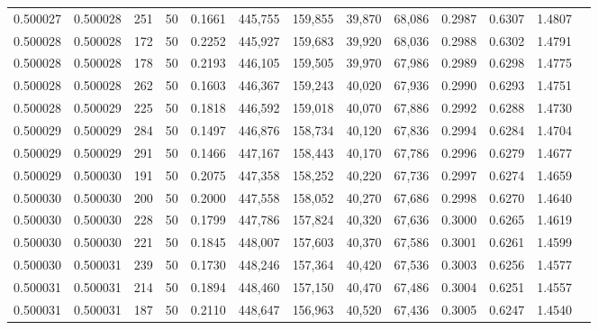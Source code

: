 \begin{tabular}{rrrrrrrrrrrrr}
0.500027 & 0.500028 &   251 &  50 &                                     0.1661 & 445,755 & 159,855 &  39,870 &  68,086 & 0.2987 & 0.6307 & 1.4807 \\
0.500028 & 0.500028 &   172 &  50 &                                     0.2252 & 445,927 & 159,683 &  39,920 &  68,036 & 0.2988 & 0.6302 & 1.4791 \\
0.500028 & 0.500028 &   178 &  50 &                                     0.2193 & 446,105 & 159,505 &  39,970 &  67,986 & 0.2989 & 0.6298 & 1.4775 \\
0.500028 & 0.500028 &   262 &  50 &                                     0.1603 & 446,367 & 159,243 &  40,020 &  67,936 & 0.2990 & 0.6293 & 1.4751 \\
0.500028 & 0.500029 &   225 &  50 &                                     0.1818 & 446,592 & 159,018 &  40,070 &  67,886 & 0.2992 & 0.6288 & 1.4730 \\
0.500029 & 0.500029 &   284 &  50 &                                     0.1497 & 446,876 & 158,734 &  40,120 &  67,836 & 0.2994 & 0.6284 & 1.4704 \\
0.500029 & 0.500029 &   291 &  50 &                                     0.1466 & 447,167 & 158,443 &  40,170 &  67,786 & 0.2996 & 0.6279 & 1.4677 \\
0.500029 & 0.500030 &   191 &  50 &                                     0.2075 & 447,358 & 158,252 &  40,220 &  67,736 & 0.2997 & 0.6274 & 1.4659 \\
0.500030 & 0.500030 &   200 &  50 &                                     0.2000 & 447,558 & 158,052 &  40,270 &  67,686 & 0.2998 & 0.6270 & 1.4640 \\
0.500030 & 0.500030 &   228 &  50 &                                     0.1799 & 447,786 & 157,824 &  40,320 &  67,636 & 0.3000 & 0.6265 & 1.4619 \\
0.500030 & 0.500030 &   221 &  50 &                                     0.1845 & 448,007 & 157,603 &  40,370 &  67,586 & 0.3001 & 0.6261 & 1.4599 \\
0.500030 & 0.500031 &   239 &  50 &                                     0.1730 & 448,246 & 157,364 &  40,420 &  67,536 & 0.3003 & 0.6256 & 1.4577 \\
0.500031 & 0.500031 &   214 &  50 &                                     0.1894 & 448,460 & 157,150 &  40,470 &  67,486 & 0.3004 & 0.6251 & 1.4557 \\
0.500031 & 0.500031 &   187 &  50 &                                     0.2110 & 448,647 & 156,963 &  40,520 &  67,436 & 0.3005 & 0.6247 & 1.4540 \\

\end{tabular}
